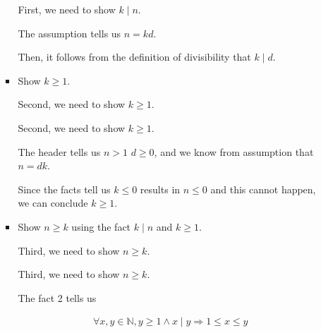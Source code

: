 \documentclass[12pt]{article}
\begin{document}
\begin{enumerate}[a.]
\begin{mdframed}
\begin{enumerate}[1.]
\begin{itemize}
            \bigskip

            \begin{mdframed}

            First, we need to show $k \mid n$.

            \bigskip

            The assumption tells us $n = kd$.

            \bigskip

            Then, it follows from the definition of divisibility that $k \mid d$.
            \end{mdframed}

            \item Show $k \geq 1$.

            \bigskip

            Second, we need to show $k \geq 1$.

            \bigskip

            \begin{mdframed}
            Second, we need to show $k \geq 1$.

            \bigskip

            The header tells us $n > 1$ $d \geq 0$, and we know from
            assumption that $n = dk$.

            \bigskip

            Since the facts tell us $k \leq 0$ results in $n \leq 0$ and this
            cannot happen, we can conclude $k \geq 1$.

            \end{mdframed}

            \item Show $n \geq k$ using the fact $k \mid n$ and $k \geq 1$.

            \bigskip

            Third, we need to show $n \geq k$.

            \bigskip

            \begin{mdframed}
            \bigskip

            Third, we need to show $n \geq k$.

            \bigskip

            The fact 2 tells us

            \begin{align}
                \forall x,y \in \mathbb{N}, y \geq 1 \land x \mid y \Rightarrow 1 \leq x \leq y
            \end{align}


\end{mdframed}
\end{itemize}
\end{enumerate}
\end{mdframed}
\end{enumerate}
\end{document}
